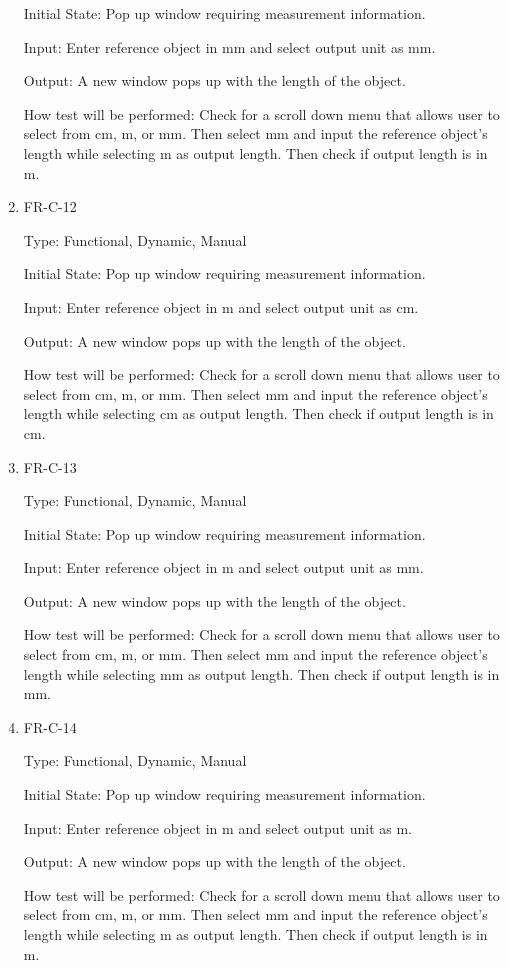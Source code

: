 \documentclass[12pt, titlepage]{article}
\begin{document}
\begin{enumerate}
					Initial State: Pop up window requiring measurement information.
					
					Input: Enter reference object in mm and select output unit as mm.
					
					Output: A new window pops up with the length of the object.
					
					How test will be performed: Check for a scroll down menu that allows user to select from cm, m, or mm. Then select mm and input the reference object's length while selecting m as output length. Then check if output length is in m.
					
				\item{FR-C-12\\}
					
					Type: Functional, Dynamic, Manual
					
					Initial State: Pop up window requiring measurement information.
					
					Input: Enter reference object in m and select output unit as cm.
					
					Output: A new window pops up with the length of the object.
					
					How test will be performed: Check for a scroll down menu that allows user to select from cm, m, or mm. Then select mm and input the reference object's length while selecting cm as output length. Then check if output length is in cm.
					
					\item{FR-C-13\\}
					
					Type: Functional, Dynamic, Manual
					
					Initial State: Pop up window requiring measurement information.
					
					Input: Enter reference object in m and select output unit as mm.
					
					Output: A new window pops up with the length of the object.
					
					How test will be performed: Check for a scroll down menu that allows user to select from cm, m, or mm. Then select mm and input the reference object's length while selecting mm as output length. Then check if output length is in mm.
					
						\item{FR-C-14\\}
					
					Type: Functional, Dynamic, Manual
					
					Initial State: Pop up window requiring measurement information.
					
					Input: Enter reference object in m and select output unit as m.
					
					Output: A new window pops up with the length of the object.
					
					How test will be performed: Check for a scroll down menu that allows user to select from cm, m, or mm. Then select mm and input the reference object's length while selecting m as output length. Then check if output length is in m.
				


\end{enumerate}
\end{document}
